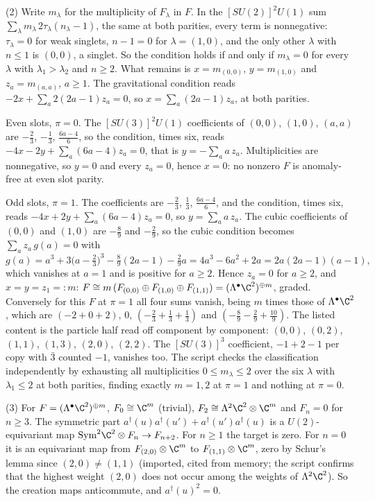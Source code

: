 (2) Write $m_{\lambda}$ for the multiplicity of $F_{\lambda}$ in $F$. In the $[SU(2)]^{2}U(1)$ sum $\sum_{\lambda} m_{\lambda}\,2\tau_{\lambda}(n_{\lambda} - 1)$, the same at both parities, every term is nonnegative: $\tau_{\lambda} = 0$ for weak singlets, $n - 1 = 0$ for $\lambda = (1, 0)$, and the only other $\lambda$ with $n \le 1$ is $(0, 0)$, a singlet. So the condition holds if and only if $m_{\lambda} = 0$ for every $\lambda$ with $\lambda_{1} > \lambda_{2}$ and $n \ge 2$. What remains is $x = m_{(0,0)}$, $y = m_{(1,0)}$ and $z_{a} = m_{(a,a)}$, $a \ge 1$. The gravitational condition reads $-2x + \sum_{a} 2(2a - 1)z_{a} = 0$, so $x = \sum_{a}(2a - 1)z_{a}$, at both parities.

Even slots, $\pi = 0$. The $[SU(3)]^{2}U(1)$ coefficients of $(0,0)$, $(1,0)$, $(a,a)$ are $-\tfrac23$, $-\tfrac13$, $\tfrac{6a - 4}{6}$, so the condition, times six, reads $-4x - 2y + \sum_{a}(6a - 4)z_{a} = 0$, that is $y = -\sum_{a} a\,z_{a}$. Multiplicities are nonnegative, so $y = 0$ and every $z_{a} = 0$, hence $x = 0$: no nonzero $F$ is anomaly-free at even slot parity.

Odd slots, $\pi = 1$. The coefficients are $-\tfrac23$, $\tfrac13$, $\tfrac{6a - 4}{6}$, and the condition, times six, reads $-4x + 2y + \sum_{a}(6a - 4)z_{a} = 0$, so $y = \sum_{a} a\,z_{a}$. The cubic coefficients of $(0,0)$ and $(1,0)$ are $-\tfrac89$ and $-\tfrac29$, so the cubic condition becomes $\sum_{a} z_{a}\,g(a) = 0$ with
\[
g(a) = a^{3} + 3\bigl(a - \tfrac23\bigr)^{3} - \tfrac89(2a - 1) - \tfrac29 a = 4a^{3} - 6a^{2} + 2a = 2a(2a - 1)(a - 1),
\]
which vanishes at $a = 1$ and is positive for $a \ge 2$. Hence $z_{a} = 0$ for $a \ge 2$, and $x = y = z_{1} =: m$: $F \cong m\,(F_{(0,0)} \oplus F_{(1,0)} \oplus F_{(1,1)}) = (\Lambda^{\bullet}\C^{2})^{\oplus m}$, graded. Conversely for this $F$ at $\pi = 1$ all four sums vanish, being $m$ times those of $\Lambda^{\bullet}\C^{2}$, which are $(-2 + 0 + 2)$, $0$, $(-\tfrac23 + \tfrac13 + \tfrac13)$ and $(-\tfrac89 - \tfrac29 + \tfrac{10}{9})$. The listed content is the particle half read off component by component: $(0,0)$, $(0,2)$, $(1,1)$, $(1,3)$, $(2,0)$, $(2,2)$. The $[SU(3)]^{3}$ coefficient, $-1 + 2 - 1$ per copy with $\bar{3}$ counted $-1$, vanishes too. The script checks the classification independently by exhausting all multiplicities $0 \le m_{\lambda} \le 2$ over the six $\lambda$ with $\lambda_{1} \le 2$ at both parities, finding exactly $m = 1, 2$ at $\pi = 1$ and nothing at $\pi = 0$.

(3) For $F = (\Lambda^{\bullet}\C^{2})^{\oplus m}$, $F_{0} \cong \C^{m}$ (trivial), $F_{2} \cong \Lambda^{2}\C^{2} \otimes \C^{m}$ and $F_{n} = 0$ for $n \ge 3$. The symmetric part $a^{\dagger}(u)a^{\dagger}(u') + a^{\dagger}(u')a^{\dagger}(u)$ is a $U(2)$-equivariant map $\mathrm{Sym}^{2}\C^{2} \otimes F_{n} \to F_{n+2}$. For $n \ge 1$ the target is zero. For $n = 0$ it is an equivariant map from $F_{(2,0)}\otimes\C^{m}$ to $F_{(1,1)}\otimes\C^{m}$, zero by Schur's lemma since $(2,0) \neq (1,1)$ (imported, cited from memory; the script confirms that the highest weight $(2,0)$ does not occur among the weights of $\Lambda^{2}\C^{2}$). So the creation maps anticommute, and $a^{\dagger}(u)^{2} = 0$.

